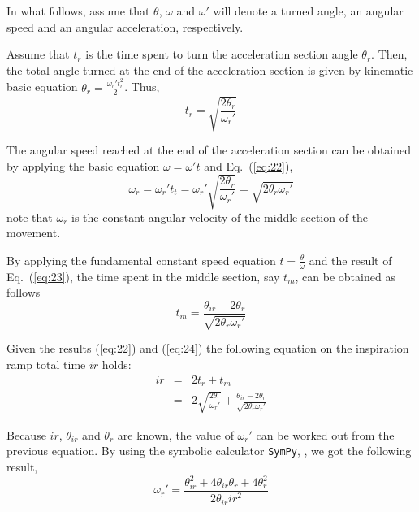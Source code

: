 \documentclass[a4paper]{article}
\begin{document}
In what follows, assume that $\theta$, $\omega$ and $\omega'$ will
denote a turned angle, an angular speed and an angular acceleration,
respectively.




Assume that $t_r$ is the time spent to turn the acceleration section
angle $\theta_r$. Then, the total angle turned at the end of the
acceleration section is given by kinematic basic equation
$\theta_r=\frac{\omega_r' t_r^2}{2}$. Thus,
\begin{equation}
  \label{eq:22}
  t_r = \sqrt{\frac{2\theta_r}{\omega_r'}}
\end{equation}

The angular speed reached at the end of the acceleration section can
be obtained by applying the basic equation $\omega=\omega' t$ and
Eq.~(\ref{eq:22}),
\begin{equation}
  \label{eq:23}
  \boxed{
    \omega_r=\omega_r' t_t= \omega_r' \sqrt{\frac{2\theta_r}{\omega_r'}} = \sqrt{2\theta_r\omega_r'}
  }
\end{equation}
note that $\omega_r$ is the constant angular velocity of the middle
section of the movement.

By applying the fundamental constant speed equation
$t=\frac{\theta}{\omega}$ and the result of Eq.~(\ref{eq:23}), the time
spent in the middle section, say $t_m$, can be obtained as follows
\begin{equation}
  \label{eq:24}
  t_m = \frac{\theta_{ir}-2\theta_r}{\sqrt{2\theta_r\omega_r'}}
\end{equation}

Given the results (\ref{eq:22}) and (\ref{eq:24}) the following
equation on the inspiration ramp total time $\mathit{ir}$ holds:
\begin{eqnarray}
  \label{eq:1}
  ir &=& 2t_r + t_m \\
    &=& 2\sqrt{\frac{2\theta_r}{\omega_r'}} +
        \frac{\theta_{ir}-2\theta_r}{\sqrt{2\theta_r\omega_r'}}
\end{eqnarray}

Because $\mathit{ir}$, $\theta_{ir}$ and $\theta_r$ are known, the value of
$\omega_r'$ can be worked out from the previous equation. By using the
symbolic calculator \texttt{SymPy}, \cite{team20:_sympy}, we got the
following result,
\begin{equation}
  \label{eq:3}
  \boxed{
    \omega_r' = \frac{\theta_{ir}^2 + 4\theta_{ir}\theta_r + 4\theta_r^2}{2\theta_{ir} \mathit{ir}^2}
  }
\end{equation}
\end{document}
